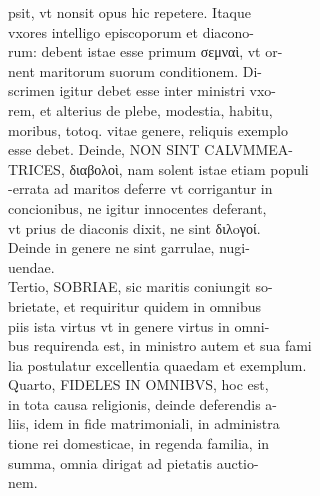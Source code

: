 \documentclass{article}
\begin{document}
\begin{pages}
                psit, vt nonsit opus hic repetere. Itaque \\
                vxores intelligo episcoporum et diacono- \\
                rum: debent istae esse primum σεμναὶ, vt or- \\
                nent maritorum suorum conditionem. Di- \\
                scrimen igitur debet esse inter ministri vxo- \\
                rem, et alterius de plebe, modestia, habitu, \\
                moribus, totoq. vitae genere, reliquis exemplo \\
                esse debet. Deinde, NON SINT CALVMMEA- \\
                TRICES, διαβολοὶ, nam solent istae etiam populi \\
                -errata ad maritos deferre vt corrigantur in \\
                concionibus, ne igitur innocentes deferant, \\
                vt prius de diaconis dixit, ne sint διλoγοί. \\
                Deinde in genere ne sint garrulae, nugi- \\
                uendae. \\
                Tertio, SOBRIAE, sic maritis coniungit so- \\
                brietate, et requiritur quidem in omnibus \\
                piis ista virtus vt in genere virtus in omni- \\
                bus requirenda est, in ministro autem et sua fami \\
                lia postulatur excellentia quaedam et exemplum. \\
                Quarto, FIDELES IN OMNIBVS, hoc est, \\
                in tota causa religionis, deinde deferendis a- \\
                liis, idem in fide matrimoniali, in administra \\
                tione rei domesticae, in regenda familia, in \\
                summa, omnia dirigat ad pietatis auctio- \\
                nem. \\

\end{pages}
\end{document}
